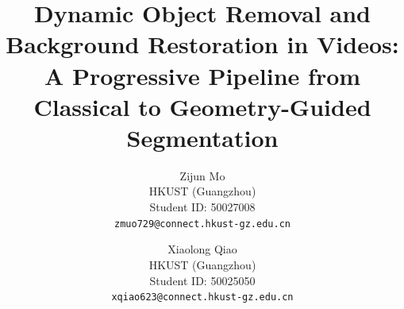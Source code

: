 \documentclass[10pt,twocolumn,letterpaper]{article}
\title{Dynamic Object Removal and Background Restoration in Videos:\\
A Progressive Pipeline from Classical to Geometry-Guided Segmentation}
\author{Zijun Mo\\
HKUST (Guangzhou)\\
Student ID: 50027008\\
{\tt\small zmuo729@connect.hkust-gz.edu.cn}
\and
Xiaolong Qiao\\
HKUST (Guangzhou)\\
Student ID: 50025050\\
{\tt\small xqiao623@connect.hkust-gz.edu.cn}
}
\begin{document}
\maketitle








{
    \small
    
    
}
\end{document}
